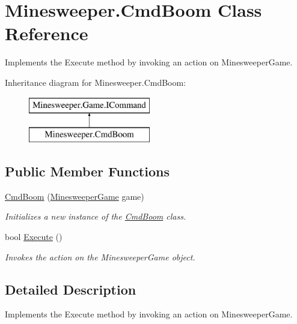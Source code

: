 \hypertarget{class_minesweeper_1_1_cmd_boom}{\section{Minesweeper.\+Cmd\+Boom Class Reference}
\label{class_minesweeper_1_1_cmd_boom}
}


Implements the Execute method by invoking an action on Minesweeper\+Game.  


Inheritance diagram for Minesweeper.\+Cmd\+Boom\+:\begin{figure}[H]
\begin{center}
\leavevmode
\includegraphics[height=2.000000cm]{class_minesweeper_1_1_cmd_boom}
\end{center}
\end{figure}
\subsection*{Public Member Functions}
\begin{DoxyCompactItemize}
\item 
\hyperlink{class_minesweeper_1_1_cmd_boom_a7d040975d77b1b48c1683b306a70a51e}{Cmd\+Boom} (\hyperlink{class_minesweeper_1_1_game_1_1_minesweeper_game}{Minesweeper\+Game} game)
\begin{DoxyCompactList}\small\item\em Initializes a new instance of the \hyperlink{class_minesweeper_1_1_cmd_boom}{Cmd\+Boom} class. \end{DoxyCompactList}\item 
bool \hyperlink{class_minesweeper_1_1_cmd_boom_ac98aceae68a835b332342321a1a53abe}{Execute} ()
\begin{DoxyCompactList}\small\item\em Invokes the action on the Minesweeper\+Game object. \end{DoxyCompactList}\end{DoxyCompactItemize}


\subsection{Detailed Description}
Implements the Execute method by invoking an action on Minesweeper\+Game. 



